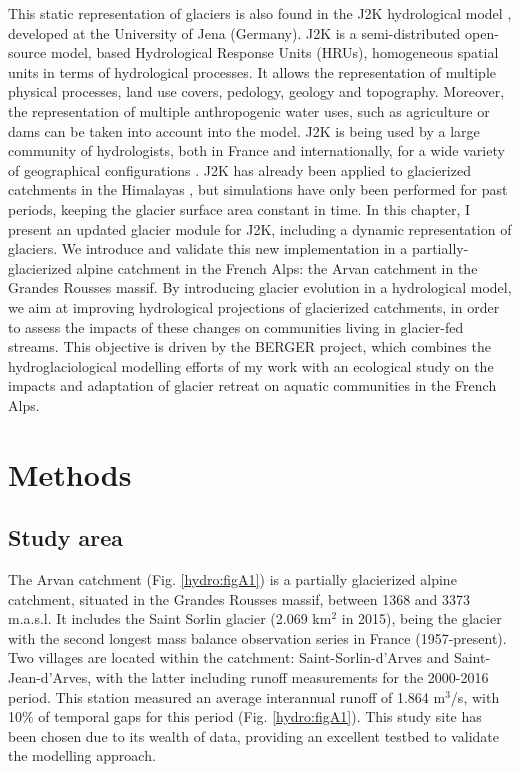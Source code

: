 This static representation of glaciers is also found in the J2K hydrological model \citep{krause_quantifying_2002}, developed at the University of Jena (Germany). J2K is a semi-distributed open-source model, based Hydrological Response Units (HRUs), homogeneous spatial units in terms of hydrological processes. It allows the representation of multiple physical processes, land use covers, pedology, geology and topography. Moreover, the representation of multiple anthropogenic water uses, such as agriculture or dams can be taken into account into the model.  J2K is being used by a large community of hydrologists, both in France and internationally, for a wide variety of geographical configurations \citep{krause_quantifying_2002, nepal_understanding_2014, braud_j2000-rhone_2017}. J2K has already been applied to glacierized catchments in the Himalayas \citep{nepal_understanding_2014}, but simulations have only been performed for past periods, keeping the glacier surface area constant in time. In this chapter, I present an updated glacier module for J2K, including a dynamic representation of glaciers. We introduce and validate this new implementation in a partially-glacierized alpine catchment in the French Alps: the Arvan catchment in the Grandes Rousses massif. By introducing glacier evolution in a hydrological model, we aim at improving hydrological projections of glacierized catchments, in order to assess the impacts of these changes on communities living in glacier-fed streams. This objective is driven by the BERGER project, which combines the hydroglaciological modelling efforts of my work with an ecological study on the impacts and adaptation of glacier retreat on aquatic communities in the French Alps.

\section{Methods}

\subsection{Study area}

The Arvan catchment (Fig. \ref{hydro:figA1}) is a partially glacierized alpine catchment, situated in the Grandes Rousses massif, between 1368 and 3373 m.a.s.l. It includes the Saint Sorlin glacier (2.069 km$^{2}$ in 2015), being the glacier with the second longest mass balance observation series in France (1957-present). Two villages are located within the catchment: Saint-Sorlin-d'Arves and Saint-Jean-d'Arves, with the latter including runoff measurements for the 2000-2016 period. This station measured an average interannual runoff of 1.864 m$^{3}$/s, with 10\% of temporal gaps for this period (Fig. \ref{hydro:figA1}). This study site has been chosen due to its wealth of data, providing an excellent testbed to validate the modelling approach.

